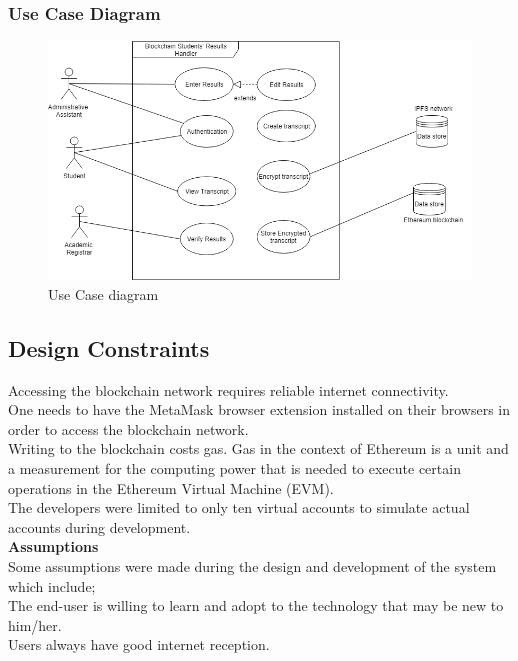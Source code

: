 \subsubsection{Use Case Diagram}
\begin{figure}[H]
\includegraphics[scale=0.5]{images/UseCaseDiagram.png}
\caption{Use Case diagram}
\end{figure}

\subsection{Design Constraints}
Accessing the blockchain network requires reliable internet connectivity.\\

One needs to have the MetaMask browser extension installed on their browsers in order to access the blockchain network.\\

Writing to the blockchain costs gas. Gas in the context of Ethereum is a unit and a measurement for the computing power that is needed to execute certain operations in the Ethereum Virtual Machine (EVM).\\

The developers were limited to only ten virtual accounts to simulate actual accounts during development.\\


\textbf{Assumptions}\\
Some assumptions were made during the design and development of the system which include;\\

The end-user is willing to learn and adopt to the technology that may be new to him/her.\\

Users always have good internet reception.\\

